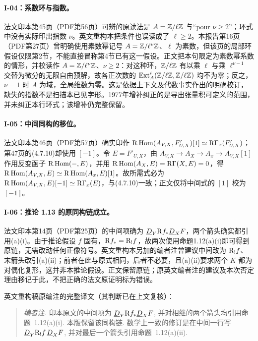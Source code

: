 \hypertarget{collation-I-04}{}

\paragraph*{I-04：系数环与指数。}法文印本第45页（PDF第56页）可辨的原读法是 $A=\mathbb Z/\ell\mathbb Z$ 与“pour $\nu\geqslant2$”；环式中没有实际印出指数 $\nu$。英文重构本把条件也误读成了 $\ell\geqslant2$。本报告第16页（PDF第27页）曾明确使用素数幂记号 $A=\mathbb Z/\ell^\nu\mathbb Z$、$\ell$ 为素数，但该页的局部环假设仅限第2节，不能直接冒称第4节已有这一假设。正文把本句限定为素数幂系数的情形，并校读作 $A=\mathbb Z/\ell^\nu\mathbb Z$、$\nu\geqslant2$：对这种环，$\mathbb Z/\ell\mathbb Z$ 有以乘 $\ell$ 与乘 $\ell^{\nu-1}$ 交替为微分的无限自由预解，故各正次数的 $\operatorname{Ext}_A^i(\mathbb Z/\ell\mathbb Z,\mathbb Z/\ell\mathbb Z)$ 均不为零；反之，$\nu=1$ 时 $A$ 为域，全局维数为零。这是依据上下文及代数事实作出的明确校订，缺失的指数不是扫描本已见字形。1977年增补纠正的是导出张量积可定义的范围，并未纠正本行环式；该增补仍完整保留。

\hypertarget{collation-I-05}{}

\paragraph*{I-05：中间同构的移位。}法文印本第46页（PDF第57页）确实印作 $\mathrm R\operatorname{Hom}(A_{V,X},F'_{U,X})[1]\simeq\mathrm R\Gamma_x(F'_{U,X})$；第47页的(4.7.10)却使用 $[-1]$。令 $E=F'_{U,X}$，由 $A_{V,X}\to A_X\to A_x\to A_{V,X}[1]$ 作用反变函子 $\mathrm R\operatorname{Hom}(-,E)$，并用 $\mathrm R\operatorname{Hom}(A_X,E)=\mathrm R\Gamma(X,E)=0$，得 $\mathrm R\operatorname{Hom}(A_{V,X},E)\simeq\mathrm R\operatorname{Hom}(A_x,E)[1]$。故所需式必为 $\mathrm R\operatorname{Hom}(A_{V,X},E)[-1]\simeq\mathrm R\Gamma_x(E)$，与(4.7.10)一致；正文仅将中间式的 $[1]$ 校为 $[-1]$。

\hypertarget{collation-I-06}{}

\paragraph*{I-06：推论 1.13 的原同构链成立。}法文印本第14页（PDF第25页）的中间项确为 $\underline D_Y\mathrm R f_*\underline D_XF$，两个箭头确实都引用(a)(i)。由于推论假设 $f$ 固有，$\mathrm R f_*=\mathrm R_!f$，故两次使用命题1.12(a)(i)即可得到原链，无需改动任何正像符号。英文重构本另加的编者注曾建议中间改为 $\mathrm R_!f$、末箭头改引(a)(ii)；前者在此与原式相同，后者不必要，且(a)(ii)要求两个 $K$ 都为对偶化复形，这并非本推论假设。正文保留原链；原英文编者注的建议及本次否定理由移记于此，不把正确的法文原证明标为错误。

英文重构稿原编注的完整译文（其判断已在上文复核）：
\begin{quote}\small
\emph{编者注.} 印本原文的中间项为 $\underline D_Y\mathrm R f_*\underline D_XF$, 并对相继的两个箭头均引用命题~1.12(a)(i). 本版保留该同构链. 数学上一致的修订是在中间一行写 $\underline D_Y\mathrm R_!f\,\underline D_XF$, 并对最后一个箭头引用命题~1.12(a)(ii).
\end{quote}

